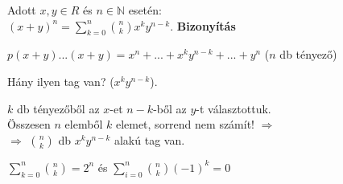 \begin{frame}
  \begin{tcolorbox}[title={Tétel: Binomiális tétel}]
    Adott $x, y \in R$ és $n \in \mathbb{N}$ esetén:\\
    $(x + y)^n = \sum_{k = 0}^n {n \choose k} x^ky^{n - k}$.
  \tcblower
    \textbf{Bizonyítás}\\
    \mmedskip

    $p(x + y) ... (x + y) = x^n + ... + x^ky^{n - k} + ... + y^n$ ($n$ db tényező)\\
    \mmedskip

    Hány ilyen tag van? ($x^ky^{n - k}$).\\
    \mmedskip

    $k$ db tényezőből az $x$-et $n - k$-ből az $y$-t választottuk.\\
    Összesen $n$ elemből $k$ elemet, sorrend nem számít! $\Rightarrow$\\
    $\Rightarrow$ ${n \choose k}$ db $x^ky^{n - k}$ alakú tag van.
  \end{tcolorbox}


  \begin{tcolorbox}[title={Tétel: Következmény (Binomiális tétel)}]
    $\sum_{k = 0}^n {n \choose k} = 2^n$ és $\sum_{i = 0}^n {n \choose k} (-1)^k = 0$
  \end{tcolorbox}
\end{frame}

